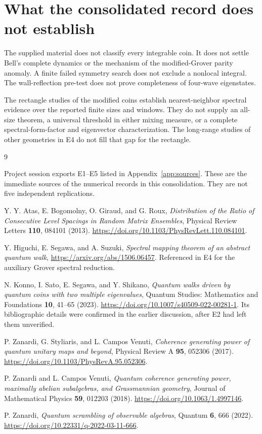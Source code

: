 \documentclass[11pt,a4paper,oneside]{report}
\numberwithin{equation}{chapter}
\begin{document}
\section{What the consolidated record does not establish}

The supplied material does not classify every integrable coin. It
does not settle Bell's complete dynamics or the mechanism of the
modified-Grover parity anomaly. A finite failed symmetry search does
not exclude a nonlocal integral. The wall-reflection pre-test does
not prove completeness of four-wave eigenstates.

The rectangle studies of the modified coins establish
nearest-neighbor spectral evidence over the reported finite sizes and
windows. They do not supply an all-size theorem, a universal threshold
in either mixing measure, or a complete spectral-form-factor and
eigenvector characterization. The long-range studies of other
geometries in E4 do not fill that gap for the rectangle.

\clearpage
\begin{thebibliography}{9}
\raggedright
{}
Project session exports E1--E5 listed in Appendix~\ref{app:sources}.
These are the immediate sources of the numerical records in this
consolidation. They are not five independent replications.

Y. Y. Atas, E. Bogomolny, O. Giraud, and G. Roux,
\emph{Distribution of the Ratio of Consecutive Level Spacings in Random
Matrix Ensembles}, Physical Review Letters \textbf{110}, 084101 (2013).
\url{https://doi.org/10.1103/PhysRevLett.110.084101}.

Y. Higuchi, E. Segawa, and A. Suzuki,
\emph{Spectral mapping theorem of an abstract quantum walk},
\url{https://arxiv.org/abs/1506.06457}.
Referenced in E4 for the auxiliary Grover spectral reduction.

N. Konno, I. Sato, E. Segawa, and Y. Shikano,
\emph{Quantum walks driven by quantum coins with two multiple eigenvalues},
Quantum Studies: Mathematics and Foundations \textbf{10}, 41--65 (2023).
\url{https://doi.org/10.1007/s40509-022-00281-1}.
Its bibliographic details were confirmed in the earlier discussion,
after E2 had left them unverified.

P. Zanardi, G. Styliaris, and L. Campos Venuti,
\emph{Coherence generating power of quantum unitary maps and beyond},
Physical Review A \textbf{95}, 052306 (2017).
\url{https://doi.org/10.1103/PhysRevA.95.052306}.

P. Zanardi and L. Campos Venuti,
\emph{Quantum coherence generating power, maximally abelian subalgebras,
and Grassmannian geometry}, Journal of Mathematical Physics
\textbf{59}, 012203 (2018).
\url{https://doi.org/10.1063/1.4997146}.

P. Zanardi, \emph{Quantum scrambling of observable algebras},
Quantum \textbf{6}, 666 (2022).
\url{https://doi.org/10.22331/q-2022-03-11-666}.
\end{thebibliography}
\end{document}
